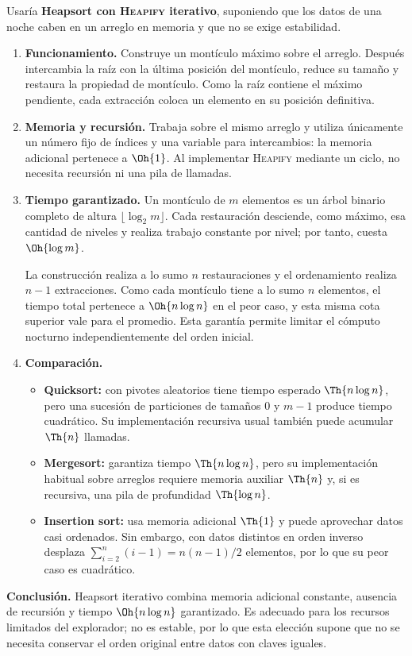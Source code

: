 
Usaría \textbf{Heapsort con \textsc{Heapify} iterativo}, suponiendo que los datos de una noche caben en un arreglo en memoria y que no se exige estabilidad.

\begin{enumerate}
\item \textbf{Funcionamiento.} Construye un montículo máximo sobre el arreglo. Después intercambia la raíz con la última posición del montículo, reduce su tamaño y restaura la propiedad de montículo. Como la raíz contiene el máximo pendiente, cada extracción coloca un elemento en su posición definitiva.

\item \textbf{Memoria y recursión.} Trabaja sobre el mismo arreglo y utiliza únicamente un número fijo de índices y una variable para intercambios: la memoria adicional pertenece a $\Oh{1}$. Al implementar \textsc{Heapify} mediante un ciclo, no necesita recursión ni una pila de llamadas.

\item \textbf{Tiempo garantizado.} Un montículo de $m$ elementos es un árbol binario completo de altura $\lfloor\log_2 m\rfloor$. Cada restauración desciende, como máximo, esa cantidad de niveles y realiza trabajo constante por nivel; por tanto, cuesta $\Oh{\log m}$.

La construcción realiza a lo sumo $n$ restauraciones y el ordenamiento realiza $n-1$ extracciones. Como cada montículo tiene a lo sumo $n$ elementos, el tiempo total pertenece a $\Oh{n\log n}$ en el peor caso, y esta misma cota superior vale para el promedio. Esta garantía permite limitar el cómputo nocturno independientemente del orden inicial.

\item \textbf{Comparación.}
\begin{itemize}
\item \textbf{Quicksort:} con pivotes aleatorios tiene tiempo esperado $\Th{n\log n}$, pero una sucesión de particiones de tamaños $0$ y $m-1$ produce tiempo cuadrático. Su implementación recursiva usual también puede acumular $\Th{n}$ llamadas.
\item \textbf{Mergesort:} garantiza tiempo $\Th{n\log n}$, pero su implementación habitual sobre arreglos requiere memoria auxiliar $\Th{n}$ y, si es recursiva, una pila de profundidad $\Th{\log n}$.
\item \textbf{Insertion sort:} usa memoria adicional $\Th{1}$ y puede aprovechar datos casi ordenados. Sin embargo, con datos distintos en orden inverso desplaza
$\sum_{i=2}^{n}(i-1)=n(n-1)/2$ elementos, por lo que su peor caso es cuadrático.
\end{itemize}
\end{enumerate}

\textbf{Conclusión.} Heapsort iterativo combina memoria adicional constante, ausencia de recursión y tiempo $\Oh{n\log n}$ garantizado. Es adecuado para los recursos limitados del explorador; no es estable, por lo que esta elección supone que no se necesita conservar el orden original entre datos con claves iguales.
\fin
